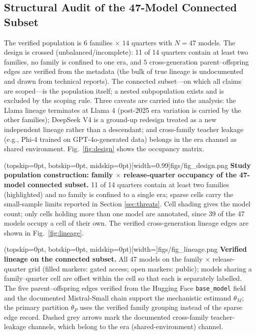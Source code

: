 \documentclass{ieeeaccess}
\theoremstyle{definition}
\theoremstyle{plain}
\begin{document}
\subsection{Structural Audit of the 47-Model Connected Subset}
The verified population is $6$ families $\times$ $14$ quarters with $N=47$ models.
The design is crossed (unbalanced/incomplete): 11 of 14 quarters contain at least
two families, no family is confined to one era, and $5$ cross-generation
parent--offspring edges are verified from the metadata (the bulk of true lineage is
undocumented and drawn from technical reports). The connected subset---on which all
claims are scoped---is the population itself; a nested subpopulation exists and is
excluded by the scoping rule. Three caveats are carried into the analysis:
the Llama lineage terminates at Llama 4 (post-2025 era variation is carried by the
other families); DeepSeek V4 is a ground-up redesign treated as a new independent
lineage rather than a descendant; and cross-family teacher leakage (e.g., Phi-4
trained on GPT-4o-generated data) belongs in the era channel as shared environment.
Fig.~\ref{fig:design} shows the occupancy matrix.

\Figure[t!](topskip=0pt, botskip=0pt, midskip=0pt)[width=0.99\columnwidth]{figs/fig_design.png}
{ \textbf{Study population construction: family $\times$ release-quarter
occupancy of the 47-model connected subset.} 11 of 14 quarters contain at least
two families (highlighted) and no family is confined to a single era; sparse
cells carry the small-sample limits reported in Section \ref{sec:threats}.
Cell shading gives the model count; only cells holding more than one model are
annotated, since 39 of the 47 models occupy a cell of their own. The verified
cross-generation lineage edges are shown in Fig.~\ref{fig:lineage}.
\label{fig:design}}

\Figure[t!](topskip=0pt, botskip=0pt, midskip=0pt)[width=\textwidth]{figs/fig_lineage.png}
{ \textbf{Verified lineage on the connected subset.} All 47 models on the
family $\times$ release-quarter grid (filled markers: gated access; open
markers: public); models sharing a family--quarter cell are offset within the
cell so that each is separately labelled. The five parent--offspring edges verified from the Hugging
Face \texttt{base\_model} field and the documented Mistral-Small chain support
the mechanistic estimand $\theta_{M}$; the primary partition $\theta_{P}$
uses the verified family grouping instead of the sparse edge record. Dashed
grey arrows mark the documented cross-family teacher-leakage channels, which
belong to the era (shared-environment) channel.\label{fig:lineage}}
\end{document}
